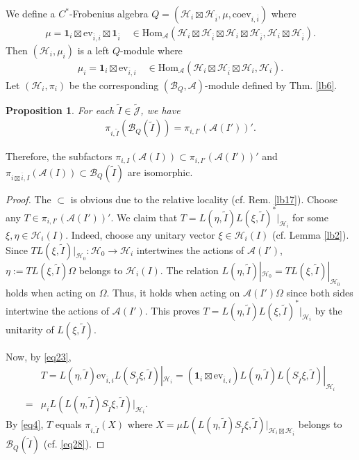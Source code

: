 \documentclass[12pt,a4paper,notitlepage]{article}
\theoremstyle{definition}
\theoremstyle{plain}
\newtheorem{pp}[df]{Proposition}
\newcommand{\mc}{\mathcal}
\newcommand{\wtd}{\widetilde}
\newcommand{\ovl}{\overline}
\newcommand{\id}{\mathbf{1}}
\newcommand{\Hom}{\mathrm{Hom}}
\newcommand{\ev}{\mathrm{ev}}
\newcommand{\coev}{\mathrm{coev}}
\newcommand{\Jtd}{\widetilde{\mathcal J}}
\numberwithin{equation}{section}
\begin{document}
We define a $C^*$-Frobenius algebra $Q=(\mc H_i\boxtimes\mc H_{\ovl i},\mu,\coev_{i,\ovl i})$ where
\begin{align*}
\mu=\id_i\boxtimes\ev_{\ovl i,i}\boxtimes\id_{\ovl i}\quad\in\Hom_{\mc A}(\mc H_i\boxtimes\mc H_{\ovl i}\boxtimes\mc H_i\boxtimes\mc H_{\ovl i},\mc H_i\boxtimes\mc H_{\ovl i}).	
\end{align*}
Then $(\mc H_i,\mu_i)$ is a left $Q$-module where
\begin{align*}
	\mu_i=\id_i\boxtimes\ev_{\ovl i,i}\quad\in\Hom_{\mc A}(\mc H_i\boxtimes\mc H_{\ovl i}\boxtimes\mc H_i,\mc H_i).	
\end{align*}
Let $(\mc H_i,\pi_i)$ be the corresponding $(\mc B_Q,\mc A)$-module defined by Thm. \ref{lb6}.


\begin{pp}
For each $\wtd I\in\Jtd$, we have
\begin{align*}
\pi_{i,\wtd I}(\mc B_Q(\wtd I))=\pi_{i,I'}(\mc A(I'))'.	
\end{align*}
\end{pp}

Therefore, the subfactors $\pi_{i,I}(\mc A(I))\subset \pi_{i,I'}(\mc A(I'))'$ and $\pi_{i\boxtimes\ovl i,I}(\mc A(I))\subset\mc B_Q(\wtd I)$ are isomorphic.

\begin{proof}
The $\subset$ is obvious due to the relative locality (cf. Rem. \ref{lb17}). Choose any $T\in \pi_{i,I'}(\mc A(I'))'$. We claim that $T=L(\eta,\wtd I)L(\xi,\wtd I)^*|_{\mc H_i}$ for some $\xi,\eta\in\mc H_i(I)$. Indeed, choose any unitary vector $\xi\in\mc H_i(I)$ (cf. Lemma \ref{lb2}). Since $TL(\xi,\wtd I)|_{\mc H_0}:\mc H_0\rightarrow\mc H_i$ intertwines the actions of $\mc A(I')$, $\eta:=TL(\xi,\wtd I)\Omega$ belongs to $\mc H_i(I)$. The relation $L(\eta,\wtd I)|_{\mc H_0}=TL(\xi,\wtd I)|_{\mc H_0}$ holds when acting on $\Omega$. Thus, it holds when acting on $\mc A(I')\Omega$ since both sides intertwine the actions of $\mc A(I')$. This proves $T=L(\eta,\wtd I)L(\xi,\wtd I)^*|_{\mc H_i}$ by the unitarity of $L(\xi,\wtd I)$. 

Now, by \eqref{eq23},
\begin{align*}
&T=L(\eta,\wtd I)\ev_{\ovl i,i}L(S_{\wtd I}\xi,\wtd I)|_{\mc H_i}=(\id_i\boxtimes \ev_{\ovl i,i})L(\eta,\wtd I)L(S_{\wtd I}\xi,\wtd I)|_{\mc H_i}\\
=&\mu_i L(L(\eta,\wtd I)S_{\wtd I}\xi,\wtd I)|_{\mc H_i}.
\end{align*}
By \eqref{eq4}, $T$ equals $\pi_{i,\wtd I}(X)$ where $X=\mu L(L(\eta,\wtd I)S_{\wtd I}\xi,\wtd I)|_{\mc H_i\boxtimes\mc H_{\ovl i}}$ belongs to $\mc B_Q(\wtd I)$ (cf. \eqref{eq28}).
\end{proof}
\end{document}
